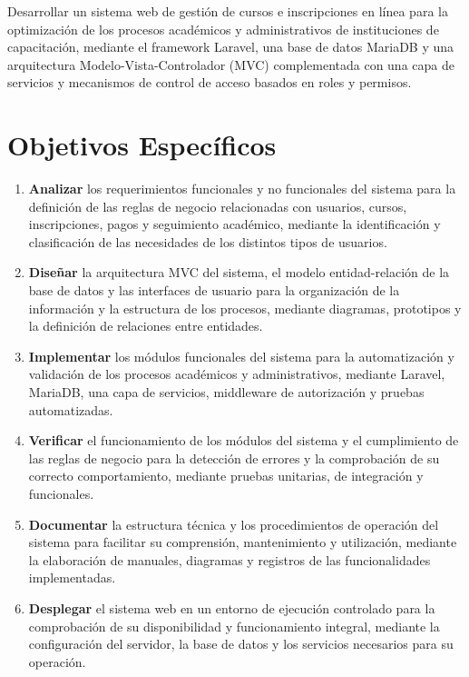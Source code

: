 Desarrollar un sistema web de gestión de cursos e inscripciones en línea para la optimización de los procesos académicos y administrativos de instituciones de capacitación, mediante el framework Laravel, una base de datos MariaDB y una arquitectura Modelo-Vista-Controlador (MVC) complementada con una capa de servicios y mecanismos de control de acceso basados en roles y permisos.

\section{Objetivos Específicos}

\begin{enumerate}

    \item \textbf{Analizar} los requerimientos funcionales y no funcionales del sistema para la definición de las reglas de negocio relacionadas con usuarios, cursos, inscripciones, pagos y seguimiento académico, mediante la identificación y clasificación de las necesidades de los distintos tipos de usuarios.

    \item \textbf{Diseñar} la arquitectura MVC del sistema, el modelo entidad-relación de la base de datos y las interfaces de usuario para la organización de la información y la estructura de los procesos, mediante diagramas, prototipos y la definición de relaciones entre entidades.

    \item \textbf{Implementar} los módulos funcionales del sistema para la automatización y validación de los procesos académicos y administrativos, mediante Laravel, MariaDB, una capa de servicios, middleware de autorización y pruebas automatizadas.

    \item \textbf{Verificar} el funcionamiento de los módulos del sistema y el cumplimiento de las reglas de negocio para la detección de errores y la comprobación de su correcto comportamiento, mediante pruebas unitarias, de integración y funcionales.

    \item \textbf{Documentar} la estructura técnica y los procedimientos de operación del sistema para facilitar su comprensión, mantenimiento y utilización, mediante la elaboración de manuales, diagramas y registros de las funcionalidades implementadas.

    \item \textbf{Desplegar} el sistema web en un entorno de ejecución controlado para la comprobación de su disponibilidad y funcionamiento integral, mediante la configuración del servidor, la base de datos y los servicios necesarios para su operación.

\end{enumerate}

